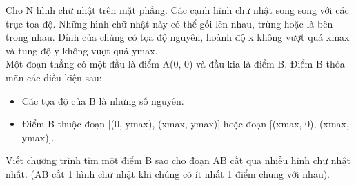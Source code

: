 Cho N hình chữ nhật trên mặt phẳng. Các cạnh hình chữ nhật song song với các trục tọa độ. Những hình chữ nhật này có thể gối lên nhau, trùng hoặc là bên trong nhau. Đỉnh của chúng có tọa độ nguyên, hoành độ x không vượt quá xmax và tung độ y không vượt quá ymax.
\\Một đoạn thẳng có một đầu là điểm A(0, 0) và đầu kia là điểm B. Điểm B thỏa mãn các điều kiện sau:
\begin{itemize}
	\item Các tọa độ của B là những số nguyên.
	\item Điểm B thuộc đoạn [(0, ymax), (xmax, ymax)] hoặc đoạn [(xmax, 0), (xmax, ymax)].
\end{itemize}

Viết chương trình tìm một điểm B sao cho đoạn AB cắt qua nhiều hình chữ nhật nhất. (AB cắt 1 hình chữ nhật khi chúng có ít nhất 1 điểm chung với nhau).

\